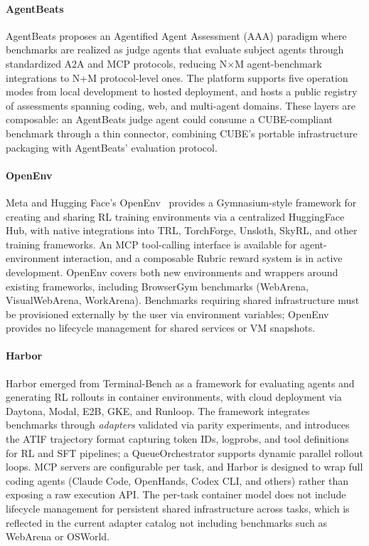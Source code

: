 \documentclass{article}
\theoremstyle{plain}
\theoremstyle{definition}
\theoremstyle{remark}
\begin{document}
\paragraph{AgentBeats} AgentBeats \citep{agentbeats2025} proposes an Agentified Agent Assessment (AAA) paradigm where benchmarks are realized as judge agents that evaluate subject agents through standardized A2A and MCP protocols, reducing N$\times$M agent-benchmark integrations to N+M protocol-level ones. The platform supports five operation modes from local development to hosted deployment, and hosts a public registry of assessments spanning coding, web, and multi-agent domains. These layers are composable: an AgentBeats judge agent could consume a CUBE-compliant benchmark through a thin connector, combining CUBE's portable infrastructure packaging with AgentBeats' evaluation protocol.

\paragraph{OpenEnv} Meta and Hugging Face's OpenEnv~\citep{openenv2025} provides a Gymnasium-style framework for creating and sharing RL training environments via a centralized HuggingFace Hub, with native integrations into TRL, TorchForge, Unsloth, SkyRL, and other training frameworks. An MCP tool-calling interface is available for agent-environment interaction, and a composable Rubric reward system is in active development. OpenEnv covers both new environments and wrappers around existing frameworks, including BrowserGym benchmarks (WebArena, VisualWebArena, WorkArena). Benchmarks requiring shared infrastructure must be provisioned externally by the user via environment variables; OpenEnv provides no lifecycle management for shared services or VM snapshots.

\paragraph{Harbor} Harbor \citep{Shaw_Harbor_Framework_2025} emerged from Terminal-Bench as a framework for evaluating agents and generating RL rollouts in container environments, with cloud deployment via Daytona, Modal, E2B, GKE, and Runloop. The framework integrates benchmarks through \emph{adapters} validated via parity experiments, and introduces the ATIF trajectory format capturing token IDs, logprobs, and tool definitions for RL and SFT pipelines; a QueueOrchestrator supports dynamic parallel rollout loops. MCP servers are configurable per task, and Harbor is designed to wrap full coding agents (Claude Code, OpenHands, Codex CLI, and others) rather than exposing a raw execution API. The per-task container model does not include lifecycle management for persistent shared infrastructure across tasks, which is reflected in the current adapter catalog not including benchmarks such as WebArena or OSWorld.
\end{document}
